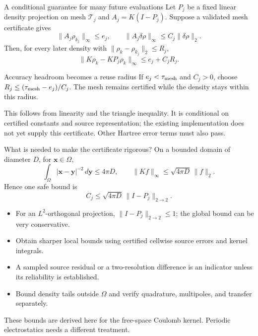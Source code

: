 \documentclass[aspectratio=169,10pt]{beamer}
\begin{document}
\begin{frame}{A conditional guarantee for many future evaluations}
\small Let $P_j$ be a fixed linear density projection on mesh $\mathcal T_j$ and
$A_j=K(I-P_j)$. Suppose a validated mesh certificate gives
\[
\|A_j\rho_{k_j}\|_\infty\le e_j,\qquad
\|A_j\delta\rho\|_\infty\le C_j\|\delta\rho\|_2.
\]
Then, for every later density with $\|\rho_k-\rho_{k_j}\|_2\le R_j$,
\[
\boxed{\|K\rho_k-KP_j\rho_k\|_\infty\le e_j+C_jR_j.}
\]
\begin{block}{Accuracy headroom becomes a reuse radius}
If $e_j<\tau_{\rm mesh}$ and $C_j>0$, choose
$R_j\le(\tau_{\rm mesh}-e_j)/C_j$.
The mesh remains certified while the density stays within this radius.
\end{block}
\footnotesize This follows from linearity and the triangle inequality. It is conditional on certified constants and source representation; the existing implementation does not yet supply this certificate. Other Hartree error terms must also pass.
\end{frame}

\begin{frame}{What is needed to make the certificate rigorous?}
\small On a bounded domain of diameter $D$, for $\bm x\in\Omega$,
\[
\int_\Omega |\bm x-\bm y|^{-2}\,d\bm y\le4\pi D,
\qquad \|Kf\|_\infty\le\sqrt{4\pi D}\,\|f\|_2.
\]
Hence one safe bound is
\[
 C_j\le\sqrt{4\pi D}\,\|I-P_j\|_{2\to2}.
\]
\begin{itemize}
\item For an $L^2$-orthogonal projection, $\|I-P_j\|_{2\to2}\le1$; the global bound can be very conservative.
\item Obtain sharper local bounds using certified cellwise source errors and kernel integrals.
\item A sampled source residual or a two-resolution difference is an indicator unless its reliability is established.
\item Bound density tails outside $\Omega$ and verify quadrature, multipoles, and transfer separately.
\end{itemize}
\footnotesize These bounds are derived here for the free-space Coulomb kernel. Periodic electrostatics needs a different treatment.
\end{frame}
\end{document}
